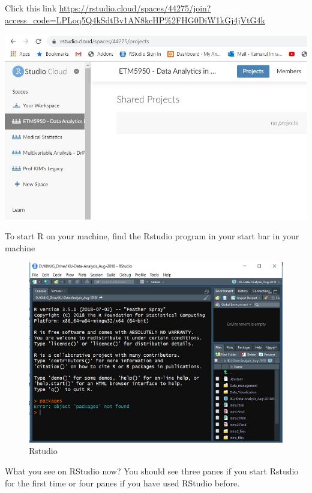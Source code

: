 \documentclass[
]{book}
\begin{document}
Click this link \url{https://rstudio.cloud/spaces/44275/join?access_code=LPLoq5Q4kSdtBv1AN8kcHP\%2FHG0DiW1kGj4jVtG4k}

\includegraphics{etm5950.jpg}

To start R on your machine, find the Rstudio program in your start bar in your machine

\begin{figure}
\centering
\includegraphics{rstudio.PNG}
\caption{Rstudio}
\end{figure}

What you see on RStudio now? You should see three panes if you start Rstudio for the first time or four panes if you have used RStudio before.
\end{document}
